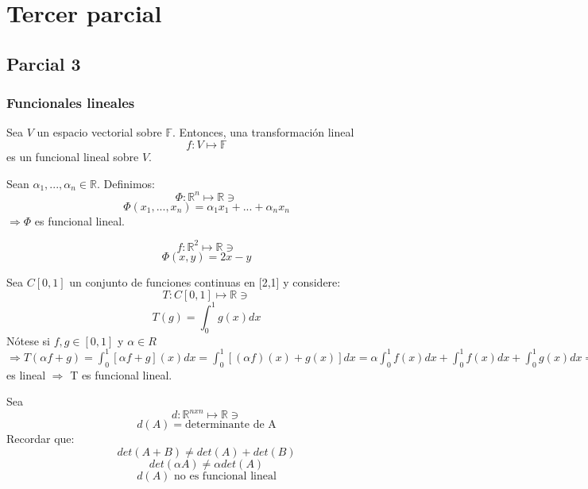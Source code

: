 \documentclass[11pt,fleqn]{book} %
\begin{document}
\part{Tercer parcial}


\chapter{Parcial 3}

\section{Funcionales lineales}

\begin{definition}
Sea $V$ un espacio vectorial sobre $\mathbb{F}$. Entonces, una transformación lineal $$f:V\mapsto\mathbb{F}$$ es un funcional lineal sobre $V$. 
\end{definition}

\begin{exercise}
Sean $\alpha_1,...,\alpha_n \in\mathbb{R}$. Definimos:
$$\Phi:\mathbb{R}^n\mapsto\mathbb{R}\ni$$
$$\Phi(x_1,...,x_n)=\alpha_{1}x_{1}+...+\alpha_{n}x_{n}$$
$\Rightarrow\Phi$ es funcional lineal. 
\end{exercise}
\begin{notation}
$$f:\mathbb{R}^2\mapsto\mathbb{R}\ni$$
$$\Phi(x,y)=2x-y$$
\end{notation}

\begin{exercise}
Sea $C[0,1]$ un conjunto de funciones continuas en [2,1] y considere:
$$T:C[0,1]\mapsto\mathbb{R}\ni$$
$$T(g)=\int^1_0 g(x)dx$$
Nótese si $f,g\in[0,1]$ y $\alpha\in R$$\Rightarrow T(\alpha f+g)=\int^1_0[\alpha f+g](x)dx=\int^1_0[(\alpha f)(x)+g(x)]dx=\alpha\int^1_0f(x)dx+\int^1_0f(x)dx+\int^1_0 g(x)dx=\alpha T[f]+T[g]\Rightarrow$ es lineal $\Rightarrow$ T es funcional lineal. 
\end{exercise}

\begin{exercise}
Sea $$d:\mathbb{R}^{nxn}\mapsto\mathbb{R}\ni$$
$$d(A)=\text{determinante de A}$$
Recordar que: $$det(A+B)\neq det(A)+det(B)$$
$$det(\alpha A)\neq \alpha det(A)$$
$$d(A) \text{ no es funcional lineal}$$
\end{exercise}
\end{document}
